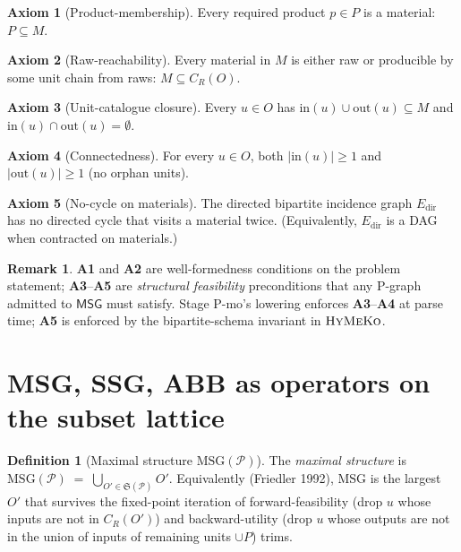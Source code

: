\documentclass[11pt,a4paper]{article}
\theoremstyle{plain}
\theoremstyle{definition}
\newtheorem{definition}[theorem]{Definition}
\newtheorem{remark}[theorem]{Remark}
\newtheorem{axiom}{Axiom}[section]
\newcommand{\HyMeKo}{\textsc{HyMeKo}}
\newcommand{\axiomref}[1]{\textbf{A#1}}
\newcommand{\msg}{\textsf{MSG}}
\newcommand{\msgop}{\mathrm{MSG}}
\newcommand{\closer}[1]{C_R(#1)}
\newcommand{\inset}[1]{\mathrm{in}(#1)}
\newcommand{\outset}[1]{\mathrm{out}(#1)}
\begin{document}
\begin{axiom}[Product-membership]
\label{ax:product}
Every required product $p \in P$ is a material:
$P \subseteq M$.
\end{axiom}

\begin{axiom}[Raw-reachability]
\label{ax:raw}
Every material in $M$ is either raw or producible by some unit
chain from raws:
$M \subseteq \closer{O}.$
\end{axiom}

\begin{axiom}[Unit-catalogue closure]
\label{ax:unit}
Every $u \in O$ has $\inset{u} \cup \outset{u} \subseteq M$ and
$\inset{u} \cap \outset{u} = \emptyset$.
\end{axiom}

\begin{axiom}[Connectedness]
\label{ax:conn}
For every $u \in O$, both $|\inset{u}| \geq 1$ and
$|\outset{u}| \geq 1$ (no orphan units).
\end{axiom}

\begin{axiom}[No-cycle on materials]
\label{ax:acycle}
The directed bipartite incidence graph $E_{\text{dir}}$ has no
directed cycle that visits a material twice. (Equivalently,
$E_{\text{dir}}$ is a DAG when contracted on materials.)
\end{axiom}

\begin{remark}
\axiomref{1} and \axiomref{2} are well-formedness conditions on
the problem statement; \axiomref{3}--\axiomref{5} are
\emph{structural feasibility} preconditions that any P-graph
admitted to $\msg$ must satisfy. Stage P-mo's lowering enforces
\axiomref{3}--\axiomref{4} at parse time; \axiomref{5} is enforced
by the bipartite-schema invariant in $\HyMeKo$.
\end{remark}

\section{MSG, SSG, ABB as operators on the subset lattice}
\label{sec:operators}

\begin{definition}[Maximal structure $\msgop(\mathcal{P})$]
\label{def:msg}
The \emph{maximal structure} is
$
\msgop(\mathcal{P}) \;=\;
\bigcup_{O' \in \mathfrak{S}(\mathcal{P})} O'.
$
Equivalently (Friedler 1992), $\msgop$ is the largest $O'$ that
survives the fixed-point iteration of forward-feasibility
(drop $u$ whose inputs are not in $\closer{O'}$) and
backward-utility (drop $u$ whose outputs are not in the union of
inputs of remaining units $\cup P$) trims.
\end{definition}
\end{document}
